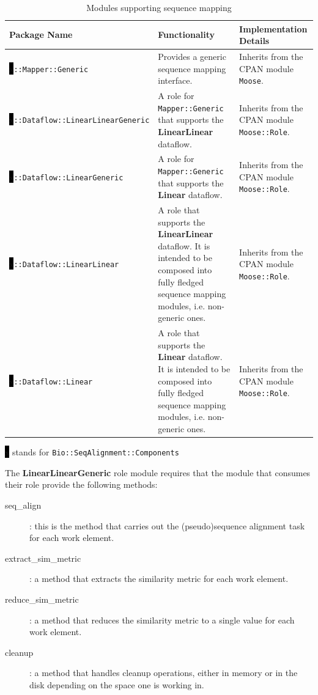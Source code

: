 \documentclass[10pt]{article}
\begin{document}
\begin{table}[H]\footnotesize\centering
\caption[Table caption text]{Modules supporting sequence mapping}
	\begin{tabularx}{1.0\textwidth}{X|p{6.0cm}|p{3.8cm}}
\toprule
	Package Name & Functionality & Implementation Details\\
\midrule
	\colorbox{black}{x}\texttt{::Mapper::Generic} & Provides a generic sequence mapping interface. & Inherits from the CPAN module \texttt{Moose}. \\
\colorbox{black}{x}\texttt{::Dataflow::LinearLinearGeneric} & A role for \texttt{Mapper::Generic} that supports the \textbf{LinearLinear} dataflow. & Inherits from  the CPAN module \texttt{Moose::Role}.\\
\colorbox{black}{x}\texttt{::Dataflow::LinearGeneric} & A role for \texttt{Mapper::Generic} that supports the \textbf{Linear} dataflow. & Inherits from the CPAN module \texttt{Moose::Role}.\\
\colorbox{black}{x}\texttt{::Dataflow::LinearLinear} & A role that supports the \textbf{LinearLinear} dataflow. It is intended to be composed into fully fledged sequence mapping modules, i.e. non-generic ones.  & Inherits from  the CPAN module \texttt{Moose::Role}.\\
\colorbox{black}{x}\texttt{::Dataflow::Linear} & A role that supports the \textbf{Linear} dataflow. It is intended to be composed into fully fledged sequence mapping modules, i.e. non-generic ones. & Inherits from the CPAN module \texttt{Moose::Role}.\\
\bottomrule
\end{tabularx}
\vspace{12pt}
\raggedright\footnotesize{\colorbox{black}{x} stands for \texttt{Bio::SeqAlignment::Components}}
\label{tab:ModulesForSeqMapping}
\end{table}


\noindent The \textbf{LinearLinearGeneric} role module requires that the module that consumes their role provide the following methods:
\begin{description}
\item[seq\_align] : this is the method that carries out the (pseudo)sequence alignment task for each work element.
\item[extract\_sim\_metric] : a method that extracts the similarity metric for each work element. 
\item[reduce\_sim\_metric] : a method that reduces the similarity metric to a single value for each work element.
\item[cleanup]: a method that handles cleanup operations, either in memory or in the disk depending on the space one is working in.
\end{description}
\end{document}
